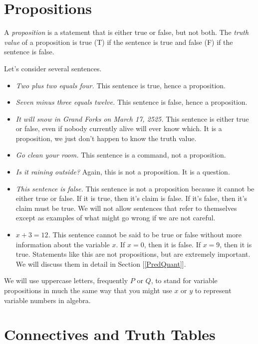 \section{Propositions}

\begin{definition}
A \emph{proposition} is a statement that is either true or false, but not both.  The \emph{truth value}  of a proposition is true (T) if the sentence is true and false (F) if the sentence is false.
\end{definition}

 Let's consider several sentences.

\begin{itemize}\itemsep0pt
\item \emph{Two plus two equals four.} This sentence is true, hence a proposition.
\item \emph{Seven minus three equals twelve.} This sentence is false, hence a proposition. 
\item \emph{It will snow in Grand Forks on March 17, 2525.} This sentence is either true or false, even if nobody currently alive will ever know which. It is a proposition, we just don't happen to know the truth value.
\item \emph{Go clean your room.} This sentence is a command, not a proposition.
\item \emph{Is it raining outside?} Again, this is not a proposition. It is a question.
\item \emph{This sentence is false.} This sentence is not a proposition because it cannot be either true or false. If it is true, then it's claim is false. If it's false, then it's claim must be true. We will not allow sentences that refer to themselves except as examples of what might go wrong if we are not careful.
\item \emph{$x+3=12$.} This sentence cannot be said to be true or false without more information about the variable $x$. If $x=0$, then it is false. If $x=9$, then it is true. Statements like this are not propositions, but are extremely important. We will discuss them in detail in Section [\ref{PredQuant}].
\end{itemize}

We will use uppercase letters, frequently $P$ or $Q$, to stand for variable propositions in much the same way that you might use $x$ or $y$ to represent variable numbers in algebra.

\section{Connectives and Truth Tables}

